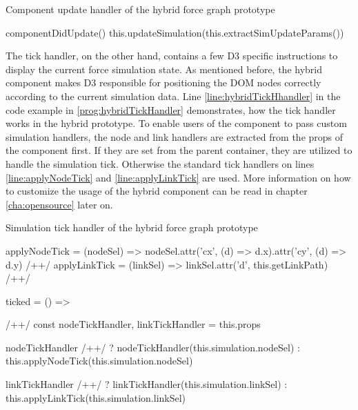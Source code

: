 \begin{program}
\caption{Component update handler of the hybrid force graph prototype}
\label{prog:hybridUpdateHandler}
\begin{JsCode}
componentDidUpdate() {
  this.updateSimulation(this.extractSimUpdateParams())
}
\end{JsCode}
\end{program}

The tick handler, on the other hand, contains a few D3 specific instructions to display the current force simulation state. As mentioned before, the hybrid component makes D3 responsible for positioning the DOM nodes correctly according to the current simulation data. Line \ref{line:hybridTickHhandler} in the code example in \ref{prog:hybridTickHandler} demonstrates, how the tick handler works in the hybrid prototype. To enable users of the component to pass custom simulation handlers, the node and link handlers are extracted from the props of the component first. If they are set from the parent container, they are utilized to handle the simulation tick. Otherwise the standard tick handlers on lines \ref{line:applyNodeTick} and \ref{line:applyLinkTick} are used. More information on how to customize the usage of the hybrid component can be read in chapter \ref{cha:opensource} later on.

\begin{program}
\caption{Simulation tick handler of the hybrid force graph prototype}
\label{prog:hybridTickHandler}
\begin{JsCode}
applyNodeTick = (nodeSel) => nodeSel.attr('cx', (d) => d.x).attr('cy', (d) => d.y) /+\label{line:applyNodeTick}+/
applyLinkTick = (linkSel) => linkSel.attr('d', this.getLinkPath) /+\label{line:applyLinkTick}+/

ticked = () => { /+\label{line:hybridTickHhandler}+/
  const { nodeTickHandler, linkTickHandler } = this.props

  nodeTickHandler /+\label{line:decideNodeTickHandler}+/
    ? nodeTickHandler(this.simulation.nodeSel)
    : this.applyNodeTick(this.simulation.nodeSel)

  linkTickHandler /+\label{line:decideLinkTickHandler}+/
    ? linkTickHandler(this.simulation.linkSel)
    : this.applyLinkTick(this.simulation.linkSel)
}
\end{JsCode}
\end{program}

